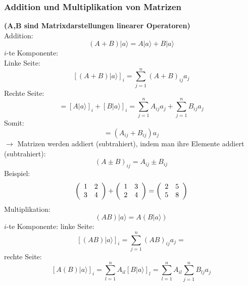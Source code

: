 \documentclass{article}
\begin{document}
\subsubsection{Addition und Multiplikation von Matrizen}
\textbf{(A,B sind Matrixdarstellungen linearer Operatoren)}\\
Addition:
\begin{equation*}
    (A+B)|a\rangle = A|a\rangle + B|a\rangle
\end{equation*}
$i$-te Komponente:\\
Linke Seite:
\begin{equation*}
    \left[\left(A+B\right)|a\rangle\right]_i = \sum_{j=1}^{n} \left(A+B\right)_{ij}a_j
\end{equation*}
Rechte Seite:
\begin{equation*}
    = \left[A|a\rangle\right]_i + \left[B|a\rangle\right]_i = \sum_{j=1}^{n} A_{ij}a_j + \sum_{j=1}^{n} B_{ij}a_j
\end{equation*}
Somit:
\begin{equation*}
    = \left(A_{ij}+B_{ij}\right)a_j
\end{equation*}
$\rightarrow$ Matrizen werden addiert (subtrahiert), indem man ihre Elemente addiert (subtrahiert):
\begin{equation*}
    (A\pm B)_{ij} = A_{ij} \pm B_{ij}
\end{equation*}
Beispiel:
\begin{equation*}
    \left(\begin{array}{c c}
        1 & 2\\
        3 & 4
    \end{array}\right) + \left(\begin{array}{c c}
        1 & 3\\
        2 & 4
    \end{array}\right) = \left(\begin{array}{c c}
        2 & 5\\
        5 & 8
    \end{array}\right)
\end{equation*}
Multiplikation:
\begin{equation*}
    (AB)|a\rangle = A(B|a\rangle)
\end{equation*}
$i$-te Komponente:
linke Seite:
\begin{equation*}
    \left[\left(AB\right)|a\rangle\right]_i = \sum_{j=1}^{n} \left(AB\right)_{ij}a_j=
\end{equation*}
rechte Seite:
\begin{equation*}
    \left[A\left(B\right)|a\rangle\right]_i = \sum_{l=1}^{n} A_{il}\left[B|a\rangle\right]_l = \sum_{l=1}^{n} A_{il}\sum_{j=1}^{n} B_{lj}a_j
\end{equation*}
\end{document}
